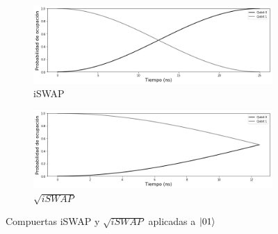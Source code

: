 \begin{figure}[H]
    \centering
    \begin{subfigure}[m]{0.49\textwidth}
        \centering \includegraphics[width=1\linewidth]{img/iswap01.png}
        \caption{iSWAP}
    \end{subfigure}
    \begin{subfigure}[m]{0.49\textwidth}
        \centering \includegraphics[width=1\linewidth]{img/sqrtiswap01.png}
        \caption{$\sqrt{iSWAP}$}
    \end{subfigure}
    \caption[Compuertas iSWAP y $\sqrt{iSWAP}$ aplicadas a $\ket{01}$]{Compuertas iSWAP y $\sqrt{iSWAP}$ aplicadas a $\ket{01}$}
\label{fig:iswapsqrtiswap01}
\end{figure}

